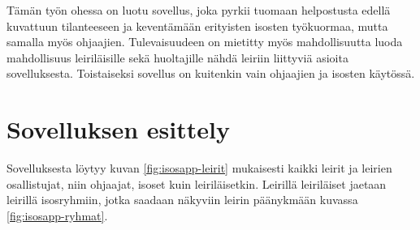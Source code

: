 Tämän työn ohessa on luotu sovellus, joka pyrkii tuomaan helpostusta edellä
kuvattuun tilanteeseen ja keventämään erityisten isosten työkuormaa, mutta
samalla myös ohjaajien. Tulevaisuudeen on mietitty myös mahdollisuutta luoda
mahdollisuus leiriläisille sekä huoltajille nähdä leiriin liittyviä asioita
sovelluksesta. Toistaiseksi sovellus on kuitenkin vain ohjaajien ja isosten
käytössä.

\section{Sovelluksen esittely}

Sovelluksesta löytyy kuvan \ref{fig:isosapp-leirit} mukaisesti kaikki leirit ja
leirien osallistujat, niin ohjaajat, isoset kuin leiriläisetkin. Leirillä
leiriläiset jaetaan leirillä isosryhmiin, jotka saadaan näkyviin leirin
päänykmään kuvassa \ref{fig:isosapp-ryhmat}.


